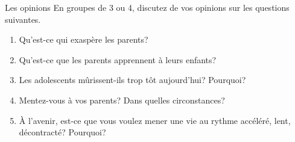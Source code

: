 \begin{frame}{Les opinions}
  En groupes de 3 ou 4, discutez de vos opinions sur les questions suivantes.
  \begin{enumerate}
    \item Qu'est-ce qui exaspère les parents?
    \item Qu'est-ce que les parents apprennent à leurs enfants?
    \item Les adolescents mûrissent-ils trop tôt aujourd'hui? Pourquoi?
    \item Mentez-vous à vos parents? Dans quelles circonstances?
    \item À l'avenir, est-ce que vous voulez mener une vie au rythme accéléré, lent, décontracté? Pourquoi?
  \end{enumerate}
\end{frame}